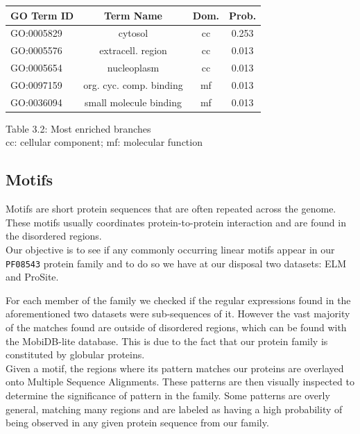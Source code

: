 \documentclass[10pt,twocolumn,letterpaper]{article}
\begin{document}
\begin{center}
    \begin{tabular}{lccc}
        \toprule
        GO Term ID & Term Name & Dom. & Prob. \\
        \midrule
        GO:0005829	& \small{cytosol} & cc & 0.253 \\
        GO:0005576	& \small{extracell. region} & cc & 0.013 \\
        GO:0005654	& \small{nucleoplasm} &	cc & 0.013 \\
        GO:0097159	& \small{org. cyc. comp. binding} & mf	& 0.013 \\
        GO:0036094	& \small{small molecule binding} & mf & 0.013 \\
        \bottomrule
    \end{tabular}
\end{center} 
\begin{center}
    \small{Table 3.2: Most enriched branches}\\
    \small{cc: cellular component; mf: molecular function}\\
    
\end{center}



\subsection{Motifs}
Motifs are short protein sequences that are often repeated across the genome. These motifs usually coordinates protein-to-protein interaction and are found in the disordered regions. \\

Our objective is to see if any commonly occurring linear motifs appear in our \texttt{PF08543} protein family and to do so we have at our disposal two datasets: ELM and ProSite.

For each member of the family we checked if the regular expressions found in the aforementioned two datasets were sub-sequences of it. However the vast majority of the matches found are outside of disordered regions, which can be found with the MobiDB-lite database. This is due to the fact that our protein family is constituted by globular proteins.\\

Given a motif, the regions where its pattern matches our proteins are overlayed onto Multiple Sequence Alignments. These patterns are then visually inspected to determine the significance of pattern in the family.
Some patterns are overly general, matching many regions and are labeled as having a high probability of being observed in any given protein sequence from our family.
\end{document}
